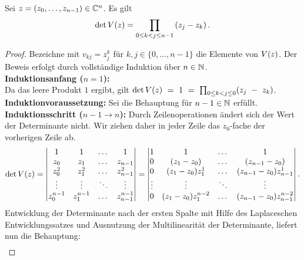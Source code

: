 \begin{lemma}
    Sei $z = (z_0, \dots, z_{n-1}) \in \mathbb{C}^n$.
    Es gilt
    \[
        \det V \! \left( z \right)
        = \prod_{0 \leq k < j \leq n-1} \left( z_j - z_k \right).
    \]
\end{lemma}

\begin{proof}
    Bezeichne mit $v_{kj} = z_j^k$ für $k,j \in \{0, \dots, n-1\}$ die Elemente von $V \! \left( z \right)$.
    Der Beweis erfolgt durch vollständige Induktion über $n \in \mathbb{N}$.\\
    \textbf{Induktionsanfang (\boldmath $n=1$):}\\
    Da das leere Produkt $1$ ergibt, gilt
    $\det{V \! \left( z \right)}~=~1~=~\prod_{0 \leq k < j \leq 0} (z_j~-~z_k)$. \\[0.5em]
    \textbf{Induktionvoraussetzung:}
    Sei die Behauptung für $n-1 \in \mathbb{N}$ erfüllt.\\[0.5em]
    \textbf{Induktionsschritt (\boldmath $n\!-\!1 \rightarrow n$):}
    Durch Zeilenoperationen ändert sich der Wert der Determinante nicht.
    Wir ziehen daher in jeder Zeile das $z_0$-fache der vorherigen Zeile ab.
    \[
        \det{V \! \left( z \right)}
        = \begin{vmatrix}
            1         & 1         & \dots & 1 \\
            z_0       & z_1       & \dots & z_{n-1} \\
            z_0^2     & z_1^2     & \dots & z_{n-1}^2 \\
            \vdots    & \vdots    & \ddots & \vdots \\
            z_0^{n-1} & z_1^{n-1} & \dots & z_{n-1}^{n-1}
        \end{vmatrix}
        = \begin{vmatrix}
            1      & 1                  & \dots & 1 \\
            0      & (z_1-z_0)          & \dots & (z_{n-1}-z_0) \\
            0      & (z_1-z_0)z_1^1     & \dots & (z_{n-1}-z_0) z_{n-1}^1 \\
            \vdots & \vdots             & \ddots & \vdots \\
            0      & (z_1-z_0)z_1^{n-2} & \dots & (z_{n-1}-z_0) z_{n-1}^{n-2}
        \end{vmatrix}.
    \]
    Entwicklung der Determinante nach der ersten Spalte mit Hilfe des
    Laplaceschen Entwicklungssatzes und Ausnutzung der Multilinearität der
    Determinante, liefert nun die Behauptung:
    \[
        \begin{split}

\end{split}\]
\end{proof}
